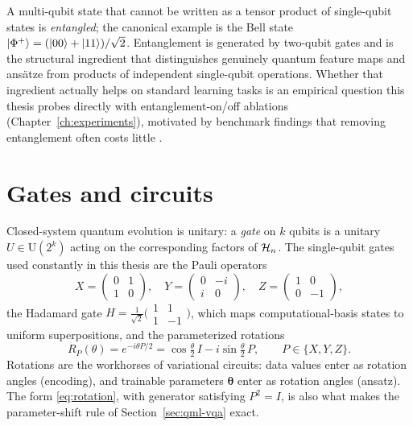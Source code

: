 A multi-qubit state that cannot be written as a tensor product of single-qubit
states is \emph{entangled}; the canonical example is the Bell state
$\left|\Phi^+\right\rangle = (\left|00\right\rangle + \left|11\right\rangle)/\sqrt{2}$. Entanglement is generated by
two-qubit gates and is the structural ingredient that distinguishes genuinely
quantum feature maps and ansätze from products of independent single-qubit
operations. Whether that ingredient actually helps on standard learning tasks
is an empirical question this thesis probes directly with
entanglement-on/off ablations (Chapter~\ref{ch:experiments}), motivated by
benchmark findings that removing entanglement often costs little
\citep{bowles2024better}.

\section{Gates and circuits}
\label{sec:qc-gates}

Closed-system quantum evolution is unitary: a \emph{gate} on $k$ qubits is a
unitary $U \in \mathrm{U}(2^k)$ acting on the corresponding factors of
$\mathcal{H}_n$. The single-qubit gates used constantly in this thesis are the Pauli
operators
\begin{equation}
  X = \begin{pmatrix} 0 & 1 \\ 1 & 0 \end{pmatrix}, \quad
  Y = \begin{pmatrix} 0 & -i \\ i & 0 \end{pmatrix}, \quad
  Z = \begin{pmatrix} 1 & 0 \\ 0 & -1 \end{pmatrix},
\end{equation}
the Hadamard gate $H = \tfrac{1}{\sqrt{2}}\bigl(\begin{smallmatrix} 1 & 1 \\
1 & -1 \end{smallmatrix}\bigr)$, which maps computational-basis states to
uniform superpositions, and the parameterized rotations
\begin{equation}
  R_P(\theta) = e^{-i \theta P / 2}
              = \cos\tfrac{\theta}{2}\, I - i \sin\tfrac{\theta}{2}\, P,
  \qquad P \in \{X, Y, Z\}.
  \label{eq:rotation}
\end{equation}
Rotations are the workhorses of variational circuits: data values enter as
rotation angles (encoding), and trainable parameters $\bm{\theta}$ enter as
rotation angles (ansatz). The form \eqref{eq:rotation}, with generator
satisfying $P^2 = I$, is also what makes the parameter-shift rule of
Section~\ref{sec:qml-vqa} exact.

